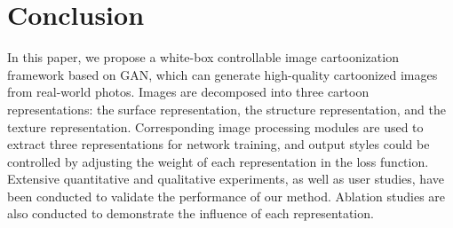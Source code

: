 \documentclass[10pt,twocolumn,letterpaper]{article}
\begin{document}
\section{Conclusion}
\vspace{-0.3em}
In this paper, we propose a white-box controllable image cartoonization framework based on GAN, which can generate high-quality cartoonized images from real-world photos. Images are decomposed into three cartoon representations: the surface representation, the structure representation, and the texture representation. Corresponding image processing modules are used to extract three representations for network training, and output styles could be controlled by adjusting the weight of each representation in the loss function. Extensive quantitative and qualitative experiments, as well as user studies, have been conducted to validate the performance of our method. Ablation studies are also conducted to demonstrate the influence of each representation.

\clearpage

{\small  }
\end{document}
